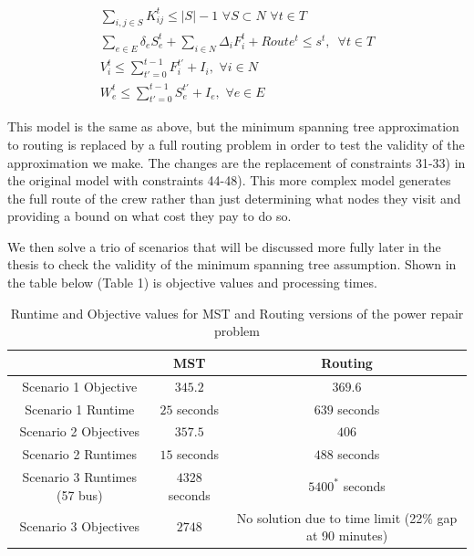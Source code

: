 \documentclass{article}
\begin{document}
\begin{eqnarray}
	\sum_{i,j \in S} K_{ij}^t \leq |S|-1 \hspace{4pt} \forall S \subset N \hspace{4pt} \forall t \in T\\
	\sum_{e \in E} \delta_{e}S_e^t + \sum_{i \in N}\Delta_{i}F_i^t + Route^t \le s^t, \hspace{6pt} \forall t \in T\\
	V_i^t \leq \sum_{t'=0}^{t-1} F_i^{t'}+I_i, \hspace{4pt} \forall i \in N\\
	W_{e}^t \leq \sum_{t'=0}^{t-1} S_{e}^{t'}+I_e, \hspace{4pt} \forall e \in E
	\end{eqnarray}

	This model is the same as above, but the minimum spanning tree approximation to routing is replaced by a full routing problem in order to test the validity of the approximation we make. The changes are the replacement of constraints 31-33) in the original model with constraints 44-48). This more complex model generates the full route of the crew rather than just determining what nodes they visit and providing a bound on what cost they pay to do so. 
	
	We then solve a trio of scenarios that will be discussed more fully later in the thesis to check the validity of the minimum spanning tree assumption. Shown in the table below (Table 1) is objective values and processing times. 
 \begin{table}[htbp]
	\centering
	\begin{tabular}{|c|c|c|}
		\cline{2-3}
		\multicolumn{1}{c|}{} & MST  & Routing \\
		\hline
		Scenario 1 Objective                & $345.2$   & $369.6$   \\
		\hline
		Scenario 1 Runtime                & $25$ seconds   & $639$ seconds \\
		\hline
		Scenario 2 Objectives               & $357.5$   & $406$  \\
		\hline
		Scenario 2 Runtimes              & $15$ seconds   & $488$ seconds \\
		\hline
		Scenario 3 Runtimes (57 bus) & $4328$ seconds & $5400^*$ seconds\\
		\hline
		Scenario 3 Objectives	& $2748$ & No solution due to time limit (22\% gap at 90 minutes)\\
		\hline
	\end{tabular}
	\caption{Runtime and Objective values for MST and Routing versions of the power repair problem}
	\label{time}
\end{table}
\end{document}
